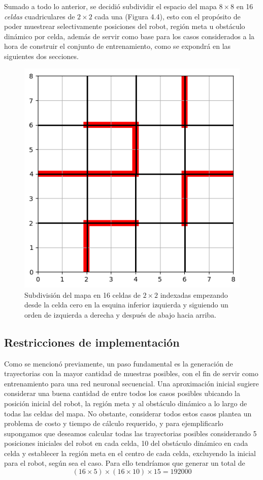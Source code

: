 \documentclass[spanish,mexico]{article}
\numberwithin{equation}{section}
\theoremstyle{definition}
\theoremstyle{remark}
\begin{document}
Sumado a todo lo anterior, se decidió subdividir el espacio del mapa $8 \times 8$ en 16 \textit{celdas} cuadriculares de $2 \times 2$ cada una (Figura 4.4), esto con el propósito de poder muestrear selectivamente posiciones del robot, región meta u obstáculo dinámico por celda, además de servir como base para los casos considerados a la hora de construir el conjunto de entrenamiento, como se expondrá en las siguientes dos secciones.
\begin{figure}[hbtp]
\centering
\includegraphics[scale=0.7]{img/cells.png}
\caption{Subdivisión del mapa en 16 celdas de $2 \times 2$ indexadas empezando desde la celda cero en la esquina inferior izquierda y siguiendo un orden de izquierda a derecha y después de abajo hacia arriba.}
\end{figure}

\subsection{Restricciones de implementación}
Como se mencionó previamente, un paso fundamental es la generación de trayectorias con la mayor cantidad de muestras posibles, con el fin de servir como entrenamiento para una red neuronal secuencial. Una aproximación inicial sugiere considerar una buena cantidad de entre todos los casos posibles ubicando la posición inicial del robot, la región meta y al obstáculo dinámico a lo largo de todas las celdas del mapa. No obstante, considerar todos estos casos plantea un problema de costo y tiempo de cálculo requerido, y para ejemplificarlo supongamos que deseamos calcular todas las trayectorias posibles considerando 5 posiciones iniciales del robot en cada celda, 10 del obstáculo dinámico en cada celda y establecer la región meta en el centro de cada celda, excluyendo la inicial para el robot, según sea el caso. Para ello tendríamos que generar un total de 
$$(16\times 5)\times(16 \times 10)\times 15 = 192000$$
\end{document}
